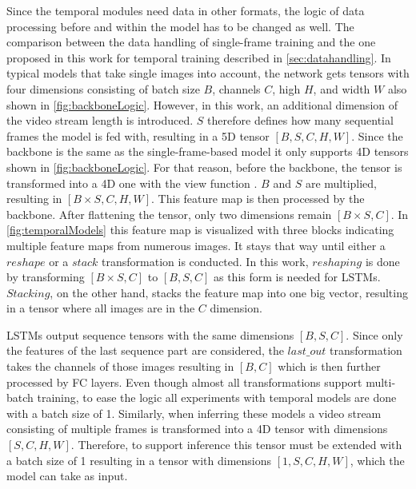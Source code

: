 Since the temporal modules need data in other formats, the logic of data processing before and within the model has to be changed as well.
The comparison between the data handling of single-frame training and the one proposed in this work for temporal training described in \autoref{sec:datahandling}.
In typical models that take single images into account, the network gets tensors with four dimensions consisting of batch size $B$, channels $C$, high $H$, and width $W$ also shown in \autoref{fig:backboneLogic}.
However, in this work, an additional dimension of the video stream length is introduced.
$S$ therefore defines how many sequential frames the model is fed with, resulting in a 5D tensor $[B, S, C, H, W]$.
Since the backbone is the same as the single-frame-based model it only supports 4D tensors shown in \autoref{fig:backboneLogic}.
For that reason, before the backbone, the tensor is transformed into a 4D one with the view function \cite{pytorch_view_docu}.
$B$ and $S$ are multiplied, resulting in $[B \times S, C, H, W]$.
This feature map is then processed by the backbone.
After flattening the tensor, only two dimensions remain $[B \times S, C]$.
In \autoref{fig:temporalModels} this feature map is visualized with three blocks indicating multiple feature maps from numerous images.
It stays that way until either a $reshape$ or a $stack$ transformation is conducted.
In this work, $reshaping$ is done by transforming $[B \times S, C]$ to $[B, S, C]$ as this form is needed for LSTMs.
$Stacking$, on the other hand, stacks the feature map into one big vector, resulting in a tensor where all images are in the $C$ dimension. 

LSTMs output sequence tensors with the same dimensions $[B, S, C]$.
Since only the features of the last sequence part are considered, the $last\_out$ transformation takes the channels of those images resulting in $[B, C]$ which is then further processed by \ac{FC} layers.
Even though almost all transformations support multi-batch training, to ease the logic all experiments with temporal models are done with a batch size of 1.
Similarly, when inferring these models a video stream consisting of multiple frames is transformed into a 4D tensor with dimensions $[S, C, H, W]$.
Therefore, to support inference this tensor must be extended with a batch size of 1 resulting in a tensor with dimensions $[1, S, C, H, W]$, which the model can take as input.
